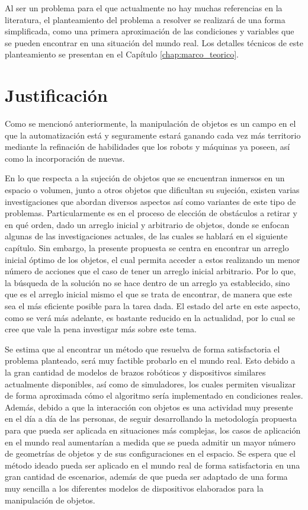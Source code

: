 Al ser un problema para el que actualmente no hay muchas referencias en la literatura, el planteamiento del problema a resolver se realizará de una forma simplificada, como una primera aproximación de las condiciones y variables que se pueden encontrar en una situación del mundo real.
Los detalles técnicos de este planteamiento se presentan en el Capítulo \ref{chap:marco_teorico}.
%
%
\section{Justificación}
%
%
Como se mencionó anteriormente, la manipulación de objetos es un campo en el que la automatización está y seguramente estará ganando cada vez más territorio mediante la refinación de habilidades que los robots y máquinas ya poseen, así como la incorporación de nuevas.

En lo que respecta a la sujeción de objetos que se encuentran inmersos en un espacio o volumen, junto a otros objetos que dificultan su sujeción, existen varias investigaciones que abordan diversos aspectos así como variantes de este tipo de problemas.
Particularmente es en el proceso de elección de obstáculos a retirar y en qué orden, dado un arreglo inicial y arbitrario de objetos, donde se enfocan algunas de las investigaciones actuales, de las cuales se hablará en el siguiente capítulo.
Sin embargo, la presente propuesta se centra en encontrar un arreglo inicial óptimo de los objetos, el cual permita acceder a estos realizando un menor número de acciones que el caso de tener un arreglo inicial arbitrario.
Por lo que, la búsqueda de la solución no se hace dentro de un arreglo ya establecido, sino que es el arreglo inicial mismo el que se trata de encontrar, de manera que este sea el más eficiente posible para la tarea dada.
El estado del arte en este aspecto, como se verá más adelante, es bastante reducido en la actualidad, por lo cual se cree que vale la pena investigar más sobre este tema.

Se estima que al encontrar un método que resuelva de forma satisfactoria el problema planteado, será muy factible probarlo en el mundo real.
Esto debido a la gran cantidad de modelos de brazos robóticos y dispositivos similares actualmente disponibles, así como de simuladores, los cuales permiten visualizar de forma aproximada cómo el algoritmo sería implementado en condiciones reales.
Además, debido a que la interacción con objetos es una actividad muy presente en el día a día de las personas, de seguir desarrollando la metodología propuesta para que pueda ser aplicada en situaciones más complejas, los casos de aplicación en el mundo real aumentarían a medida que se pueda admitir un mayor número de geometrías de objetos y de sus configuraciones en el espacio.
Se espera que el método ideado pueda ser aplicado en el mundo real de forma satisfactoria en una gran cantidad de escenarios, además de que pueda ser adaptado de una forma muy sencilla a los diferentes modelos de dispositivos elaborados para la manipulación de objetos.
%
%
